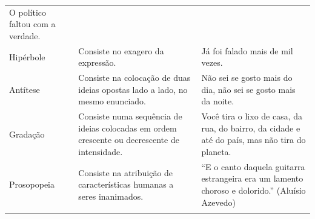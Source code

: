 \begin{longtable}[]{@{}lll@{}}
\begin{minipage}[t]{0.29\columnwidth}
O político faltou com a verdade.\strut
\end{minipage}\tabularnewline
\begin{minipage}[t]{0.29\columnwidth}\raggedright
Hipérbole\strut
\end{minipage} & \begin{minipage}[t]{0.29\columnwidth}\raggedright
Consiste no exagero da expressão.\strut
\end{minipage} & \begin{minipage}[t]{0.29\columnwidth}\raggedright
Já foi falado mais de mil vezes.\strut
\end{minipage}\tabularnewline
\begin{minipage}[t]{0.29\columnwidth}\raggedright
Antítese\strut
\end{minipage} & \begin{minipage}[t]{0.29\columnwidth}\raggedright
Consiste na colocação de duas ideias opostas lado a lado, no mesmo
enunciado.\strut
\end{minipage} & \begin{minipage}[t]{0.29\columnwidth}\raggedright
Não sei se gosto mais do dia, não sei se gosto mais da noite.\strut
\end{minipage}\tabularnewline
\begin{minipage}[t]{0.29\columnwidth}\raggedright
Gradação\strut
\end{minipage} & \begin{minipage}[t]{0.29\columnwidth}\raggedright
Consiste numa sequência de ideias colocadas em ordem crescente ou
decrescente de intensidade.\strut
\end{minipage} & \begin{minipage}[t]{0.29\columnwidth}\raggedright
Você tira o lixo de casa, da rua, do bairro, da cidade e até do país,
mas não tira do planeta.\strut
\end{minipage}\tabularnewline
\begin{minipage}[t]{0.29\columnwidth}\raggedright
Prosopopeia\strut
\end{minipage} & \begin{minipage}[t]{0.29\columnwidth}\raggedright
Consiste na atribuição de características humanas a seres
inanimados.\strut
\end{minipage} & \begin{minipage}[t]{0.29\columnwidth}\raggedright
``E o canto daquela guitarra estrangeira era um lamento choroso e
dolorido.'' (Aluísio Azevedo)\strut
\end{minipage}\tabularnewline
\begin{minipage}[t]{0.29\columnwidth}\raggedright

\end{minipage}
\end{longtable}
